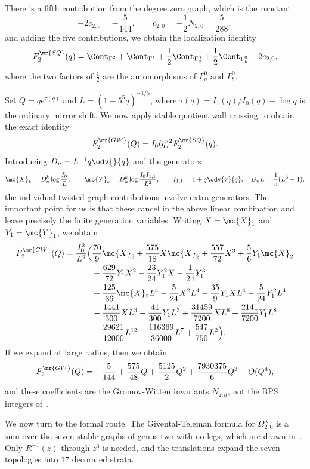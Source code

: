 There is a fifth contribution from the degree zero graph, which is the constant
\[ -2c_{2,0} = -\frac{5}{144}, \qquad c_{2,0} = -\frac{1}{2}N_{2,0} = \frac{5}{288}, \]
and adding the five contributions, we obtain the localization identity
\[ F_2^{\mr{SQ}}(q) = \Cont_{\Gamma^2} + \Cont_{\Gamma^1} + \frac{1}{2}\Cont_{\Gamma_a^0} + \frac{1}{2}\Cont_{\Gamma_b^0} - 2c_{2,0}, \]
where the two factors of \(\frac{1}{2}\) are the automorphisms of \(\Gamma_a^0\) and \(\Gamma_b^0\).

Set \(Q = qe^{\tau(q)}\) and \(L = (1-5^5q)^{-1/5}\), where \(\tau(q) = I_1(q)/I_0(q) - \log q\) is the ordinary mirror shift. We now apply stable quotient wall crossing to obtain the exact identity
\[ F_2^{\mr{GW}}(Q) = I_0(q)^2 F_2^{\mr{SQ}}(q). \]
Introducing \(D_u = L^{-1}q\odv{}{q}\) and the generators
\[ \mc{X}_k = D_u^k \log \frac{I_0}{L}, \qquad \mc{Y}_k = D_u^k \log \frac{I_0I_{1,1}}{L^2}, \qquad I_{1,1} = 1 + q \odv{\tau}{q}, \quad D_u L = \frac{1}{5}(L^5-1), \]
the individual twisted graph contributions involve extra generators. The important point for us is that these cancel in the above linear combination and leave precisely the finite generation variables. Writing \(X = \mc{X}_1\) and \(Y_1 = \mc{Y}_1\), we obtain
\begin{align*}
    F^{\mr{GW}}_2(Q) = \frac{I_0^2}{L^2}\Big(&\frac{70}{9}\mc{X}_3 + \frac{575}{18}X\mc{X}_2 + \frac{557}{72}X^3 + \frac{5}{6}Y_1\mc{X}_2 \\
    &- \frac{629}{72}Y_1X^2 - \frac{23}{24}Y_1^2 X - \frac{1}{24}Y_1^3 \\
    &+ \frac{125}{36}\mc{X}_2 L^4 - \frac{5}{24}X^2L^4 - \frac{35}{9}Y_1XL^4 - \frac{5}{24}Y_1^2L^4 \\
    &- \frac{1441}{300}XL^3 - \frac{41}{300}Y_1L^3 + \frac{31459}{7200}XL^8 + \frac{2141}{7200}Y_1L^8 \\
    &+ \frac{29621}{12000}L^{12} - \frac{116369}{36000}L^7 + \frac{547}{750}L^2\Big).
\end{align*}
If we expand at large radius, then we obtain
\[ F_2^{\mr{GW}}(Q) = -\frac{5}{144} + \frac{575}{48}Q + \frac{5125}{2}Q^2 + \frac{7930375}{6}Q^3 + O(Q^4), \]
and these coefficients are the Gromov-Witten invariants \(N_{2,d}\), not the BPS integers of~.

We now turn to the formal route. The Givental-Teleman formula for \(\Omega^{\lambda}_{2,0}\) is a sum over the seven stable graphs of genus two with no legs, which are drawn in~. Only \(R^{-1}(z)\) through \(z^3\) is needed, and the translations expand the seven topologies into \(17\) decorated strata.

